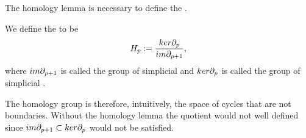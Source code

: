 \documentclass[../1.tex]{subfiles}
\begin{document}
    The homology lemma is necessary to define the .

    \begin{defn}
        We define the  to be 
        \[H_p := \frac{ker\partial_p}{im\partial_{p+1}},\] 
        where $im\partial_{p+1}$ is called the group of simplicial  and
        $ker\partial_p$ is called the group of simplicial .
    \end{defn}

    The homology group is therefore, intuitively,  the space of cycles that are not boundaries. Without the
    homology lemma the quotient would not well defined since $im\partial_{p+1} \subset ker\partial_p$ would not be satisfied.
\end{document}
